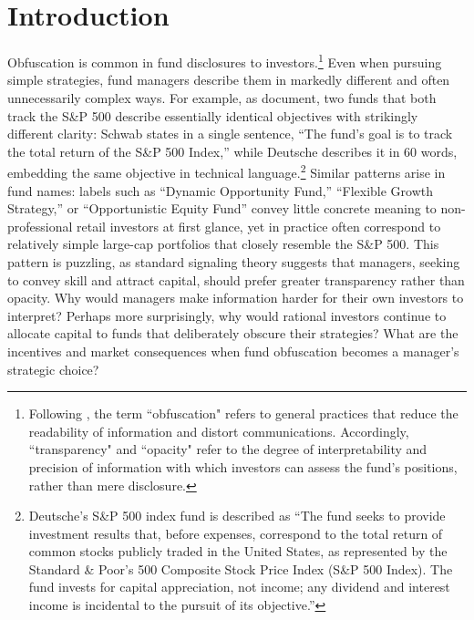 \section{Introduction}\label{sec:introduction}
Obfuscation is common in fund disclosures to investors.\footnote{Following \citet*{ellison2009search}, the term ``obfuscation" refers to general practices that reduce the readability of information and distort communications. Accordingly, ``transparency" and ``opacity" refer to the degree of interpretability and precision of information with which investors can assess the fund’s positions, rather than mere disclosure.}
Even when pursuing simple strategies, fund managers describe them in markedly different and often unnecessarily complex ways. For example, as \citet*{dehaan2021obfuscation} document, two funds that both track the S\&P 500 describe essentially identical objectives with strikingly different clarity: Schwab states in a single sentence, “The fund's goal is to track the total return of the S\&P 500 Index,” while Deutsche describes it in 60 words, embedding the same objective in technical language.\footnote{Deutsche's S\&P 500 index fund is described as “The fund seeks to provide investment results that, before expenses, correspond to the total return of common stocks publicly traded in the United States, as represented by the Standard \& Poor's 500 Composite Stock Price Index (S\&P 500 Index). The fund invests for capital appreciation, not income; any dividend and interest income is incidental to the pursuit of its objective.”} Similar patterns arise in fund names: labels such as “Dynamic Opportunity Fund,” “Flexible Growth Strategy,” or “Opportunistic Equity Fund” convey little concrete meaning to non-professional retail investors at first glance, yet in practice often correspond to relatively simple large-cap portfolios that closely resemble the S\&P 500. This pattern is puzzling, as standard signaling theory suggests that managers, seeking to convey skill and attract capital, should prefer greater transparency rather than opacity.
Why would managers make information harder for their own investors to interpret? Perhaps more surprisingly, why would rational investors continue to allocate capital to funds that deliberately obscure their strategies? What are the incentives and market consequences when fund obfuscation becomes a manager's strategic choice?

